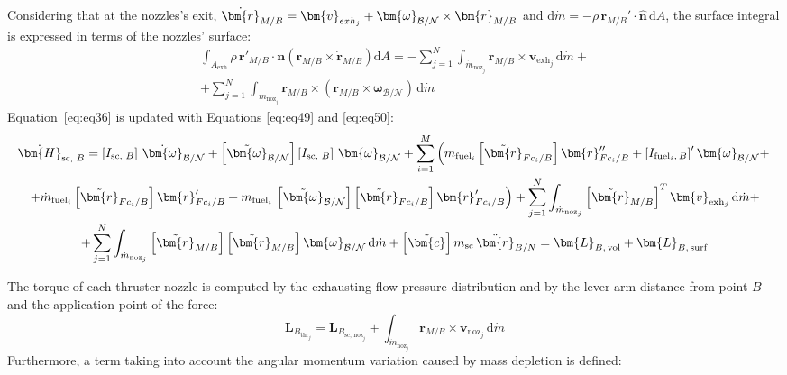 Considering that at the nozzles's exit, $\dot{\bm{r}}_{M/B} = \bm{v}_{exh_j} + \bm{\omega}_{\cal{B}/\cal{N}} \times \bm{r}_{M/B}$ and $\text{d}\dot{m} =- \rho\,\bm{r}_{M/B}'\cdot\hat{\bm{n}} \,\text{d}A$, the surface integral is expressed in terms of the nozzles' surface:
\begin{multline}\label{eq:eq50}
	\int_{A_{\text{exh}}} \rho\,\bm{r}'_{M/B}\cdot\bm{n} \left(\bm{r}_{M/B} \times \dot{\bm{r}}_{M/B}\right)\text{d}A =- \sum_{j=1}^{N}\int_{\dot{m}_{\text{noz}_j}}\bm{r}_{M/B} \times  \bm{v}_{\text{exh}_j}\,\text{d}\dot{m}+\\
	+ \sum_{j=1}^{N}\int_{\dot{m}_{\text{noz}_j}}\bm{r}_{M/B} \times\left( \bm{r}_{M/B}\times \bm{\omega} _{\mathcal{B}/\mathcal{N}}\right)\,\text{d}\dot{m}
\end{multline}
Equation~\eqref{eq:eq36} is updated with Equations \eqref{eq:eq49} and \eqref{eq:eq50}:
\begin{multline}
	\dot{\bm{H}}_{\text{sc, }B} = \left[I_{\text{sc, }B}\right]\,\dot{\bm{\omega}}_{\cal{B}/\cal{N}} + \left[\tilde{\bm{\omega}}_{\cal{B}/\cal{N}}\right]\left[I_{\text{sc, }B}\right]\,\bm{\omega}_{\cal{B}/\cal{N}} + \sum_{i=1}^{M}\left(m_{\text{fuel}_i}\left[\tilde{\bm{r}}_{Fc_i/B}\right] \bm{r}''_{Fc_i/B} + \left[I_{\text{fuel}_i,\,B}\right]' \bm{\omega}_{\cal{B}/\cal{N}}
	+\right. \\
	\left.+ \dot{m}_{\text{fuel}_i} \left[\tilde{\bm{r}}_{Fc_i/B}\right]\bm{r}'_{Fc_i/B}+  {m}_{\text{fuel}_i}\,\left[\tilde{\bm{\omega}}_{\mathcal{B}/\mathcal{N}}\right] \left[\tilde{\bm{r}}_{Fc_i/B}\right] \bm{r}'_{Fc_i/B}\right)
	+\sum_{j=1}^{N}\int_{\dot{m}_{\text{noz}_j}}\left[\tilde{\bm{r}}_{M/B}\right] ^T  \bm{v}_{\text{exh}_j}\,\text{d}\dot{m}+\\
	+\sum_{j=1}^{N}\int_{\dot{m}_{\text{noz}_j}}\left[\tilde{\bm{r}}_{M/B}\right]   \left[\tilde{\bm{r}}_{M/B}\right]  \bm{\omega} _{\mathcal{B}/\mathcal{N}} \,\text{d}\dot{m} +\left[\tilde{\bm{c}}\right] m_{\text{sc}}\,\ddot{\bm{r}}_{B/N}=\bm{L}_{B,\,\text{vol}}+\bm{L}_{B,\,\text{surf}}
\end{multline}

The torque of each thruster nozzle is computed by the exhausting flow pressure distribution and by the lever arm distance from point $B$ and the application point of the force:
\begin{equation}
	\bm{L}_{B_{\text{thr}_j}} = \bm{L}_{B_{\text{sc, noz}_j}} + \int_{\dot{m}_{\text{noz}_j}}\bm{r}_{M/B} \times  \bm{v}_{\text{noz}_j}\,\text{d}\dot{m}
\end{equation}
Furthermore, a term taking into account the angular momentum variation caused by mass depletion is defined:

